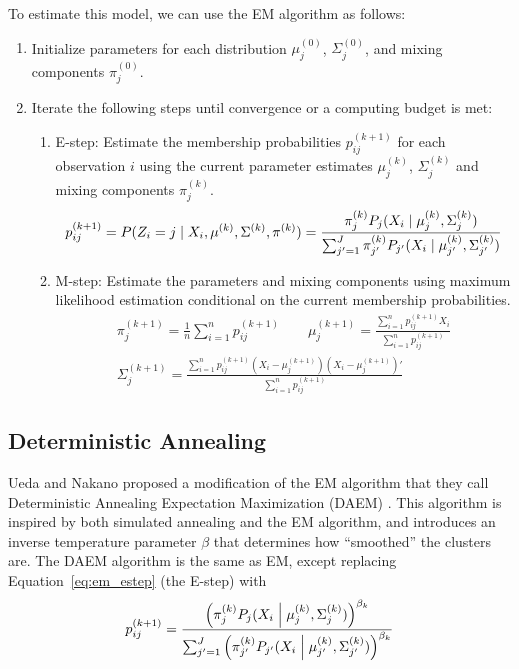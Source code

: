 \documentclass{article}
\newcommand*{\cond}{\;\ifnum\currentgrouptype=16 \middle\fi|\;}
\theoremstyle{definition}
\theoremstyle{algodesc}
\begin{document}
To estimate this model, we can use the EM algorithm as follows:
\begin{enumerate}
\item Initialize parameters for each distribution $\mu_j^{(0)}$, $\Sigma_j^{(0)}$, and mixing components $\pi_j^{(0)}$.
\item Iterate the following steps until convergence or a computing budget is met:
  \begin{enumerate}
  \item E-step: Estimate the membership probabilities $p_{ij}^{(k+1)}$ for each observation $i$ using the current parameter estimates $\mu_j^{(k)}$, $\Sigma_j^{(k)}$ and mixing components $\pi_j^{(k)}$.
    \begin{equation} \label{eq:em_estep}
    p_{ij}^{(k+1)} = P(Z_i = j \cond X_i, \mu^{(k)}, \Sigma^{(k)}, \pi^{(k)})
      = \frac{\pi_j^{(k)} P_j(X_i \cond \mu_j^{(k)}, \Sigma_j^{(k)})}{\sum_{j'=1}^J \pi_{j'}^{(k)} P_{j'}(X_i \cond \mu_{j'}^{(k)}, \Sigma_{j'}^{(k)})}
    \end{equation}
  \item M-step: Estimate the parameters and mixing components using maximum likelihood estimation conditional on the current membership probabilities.
    \begin{equation} \label{eq:em_mstep}
    \begin{gathered}
    \pi_j^{(k+1)} = \frac{1}{n} \sum_{i=1}^n p_{ij}^{(k+1)} \qquad
    \mu_j^{(k+1)} = \frac{\sum_{i=1}^n p_{ij}^{(k+1)} X_i}{\sum_{i=1}^n p_{ij}^{(k+1)}} \\
    \Sigma_j^{(k+1)} = \frac{\sum_{i=1}^n p_{ij}^{(k+1)} (X_i - \mu_j^{(k+1)}) (X_i - \mu_j^{(k+1)})'}{\sum_{i=1}^n p_{ij}^{(k+1)}}
    \end{gathered}
    \end{equation}
  \end{enumerate}
\end{enumerate}


\subsection{Deterministic Annealing}

Ueda and Nakano proposed a modification of the EM algorithm that they call Deterministic Annealing Expectation Maximization (DAEM) \cite{uedanakano98}. This algorithm is inspired by both simulated annealing and the EM algorithm, and introduces an inverse temperature parameter $\beta$ that determines how ``smoothed'' the clusters are. The DAEM algorithm is the same as EM, except replacing Equation~\ref{eq:em_estep} (the E-step) with
  \begin{equation} \label{eq:da_estep}
  p_{ij}^{(k+1)}
    = \frac{\left( \pi_j^{(k)} P_j(X_i \cond \mu_j^{(k)}, \Sigma_j^{(k)}) \right)^{\beta_k}}{\sum_{j'=1}^J \left( \pi_{j'}^{(k)} P_{j'}(X_i \cond \mu_{j'}^{(k)}, \Sigma_{j'}^{(k)}) \right)^{\beta_k}}
  \end{equation}
\end{document}
